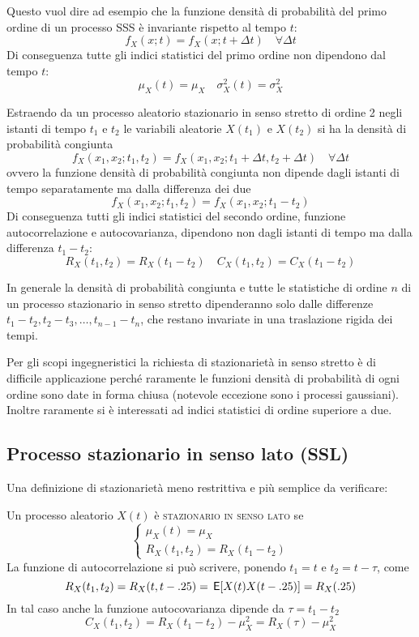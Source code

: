 Questo vuol dire ad esempio che la funzione densità di probabilità del primo ordine di un processo SSS è invariante rispetto al tempo $t$:
\[f_X(x;t)=f_X(x;t+\Delta t)\quad\forall\Delta t\]
Di conseguenza tutte gli indici statistici del primo ordine non dipendono dal tempo $t$:
\[\mu_X(t)=\mu_X\quad \sigma^2_X(t)=\sigma^2_X\]

Estraendo da un processo aleatorio stazionario in senso stretto di ordine 2 negli istanti di tempo $t_1$ e $t_2$ le variabili aleatorie $X(t_1)$ e $X(t_2)$ si ha la densità di probabilità congiunta
\[f_X(x_1,x_2;t_1,t_2)=f_X(x_1,x_2;t_1+\Delta t,t_2+\Delta t)\quad\forall\Delta t\]
ovvero la funzione densità di probabilità congiunta non dipende dagli istanti di tempo separatamente ma dalla differenza dei due
\begin{equation}
f_X(x_1,x_2;t_1,t_2)=f_X(x_1,x_2;t_1-t_2)
\end{equation}
Di conseguenza tutti gli indici statistici del secondo ordine, funzione autocorrelazione e autocovarianza, dipendono non dagli istanti di tempo ma dalla differenza $t_1-t_2$:
\[R_X(t_1,t_2)=R_X(t_1-t_2)\quad C_X(t_1,t_2)=C_X(t_1-t_2)\]

In generale la densità di probabilità congiunta e tutte le statistiche di ordine $n$ di un processo stazionario in senso stretto dipenderanno solo dalle differenze $t_1-t_2, t_2-t_3, \dots, t_{n-1}-t_n$, che restano invariate in una traslazione rigida dei tempi.

\begin{nota}Per gli scopi ingegneristici la richiesta di stazionarietà in senso stretto è di difficile applicazione perché raramente le funzioni densità di probabilità di ogni ordine sono date in forma chiusa (notevole eccezione sono i processi gaussiani). Inoltre raramente si è interessati ad indici statistici di ordine superiore a due.
\end{nota}

\subsection{Processo stazionario in senso lato (SSL)}
Una definizione di stazionarietà meno restrittiva e più semplice da verificare:

Un processo aleatorio $X(t)$ è \textsc{stazionario in senso lato} se
\begin{equation}\label{eq:processo_stazionario_senso_lato}
\begin{cases}
\mu_X(t)=\mu_X\\
R_X(t_1,t_2)=R_X(t_1-t_2)
\end{cases}
\end{equation}
La funzione di autocorrelazione si può scrivere, ponendo $t_1=t$ e $t_2=t-\tau$, come \begin{equation}R_X(t_1,t_2)=R_X(t,t-.25)=\,{\operatorname{\mathsf{E}}}\!\left[{X(t)X(t-.25)}\right]=R_X(.25)\end{equation}
In tal caso anche la funzione autocovarianza dipende da $\tau=t_1-t_2$
\begin{equation}C_X(t_1,t_2)=R_X(t_1-t_2)-\mu^2_X=R_X(\tau)-\mu^2_X\end{equation}


